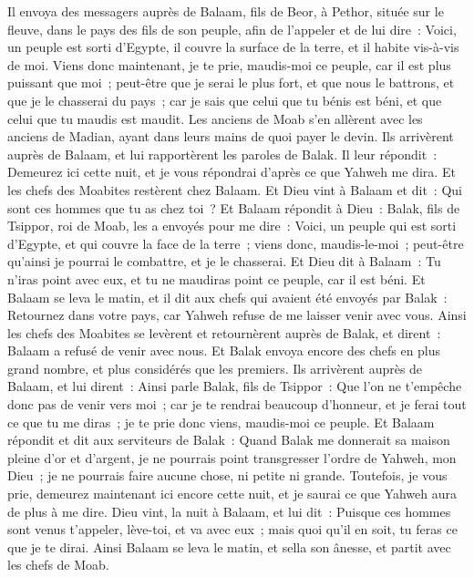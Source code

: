 \begin{multicols}{2}
Il envoya des messagers auprès de Balaam, fils de Beor, à Pethor, située sur le fleuve, dans le pays des fils de son peuple, afin de l'appeler et de lui dire~: Voici, un peuple est sorti d'Egypte, il couvre la surface de la terre, et il habite vis-à-vis de moi.
Viens donc maintenant, je te prie, maudis-moi ce peuple, car il est plus puissant que moi~; peut-être que je serai le plus fort, et que nous le battrons, et que je le chasserai du pays~; car je sais que celui que tu bénis est béni, et que celui que tu maudis est maudit.
Les anciens de Moab s'en allèrent avec les anciens de Madian, ayant dans leurs mains de quoi payer le devin. Ils arrivèrent auprès de Balaam, et lui rapportèrent les paroles de Balak.
Il leur répondit~: Demeurez ici cette nuit, et je vous répondrai d'après ce que Yahweh me dira. Et les chefs des Moabites restèrent chez Balaam.
Et Dieu vint à Balaam et dit~: Qui sont ces hommes que tu as chez toi~?
Et Balaam répondit à Dieu~: Balak, fils de Tsippor, roi de Moab, les a envoyés pour me dire~:
Voici, un peuple qui est sorti d'Egypte, et qui couvre la face de la terre~; viens donc, maudis-le-moi~; peut-être qu'ainsi je pourrai le combattre, et je le chasserai.
Et Dieu dit à Balaam~: Tu n'iras point avec eux, et tu ne maudiras point ce peuple, car il est béni.
Et Balaam se leva le matin, et il dit aux chefs qui avaient été envoyés par Balak~: Retournez dans votre pays, car Yahweh refuse de me laisser venir avec vous.
Ainsi les chefs des Moabites se levèrent et retournèrent auprès de Balak, et dirent~: Balaam a refusé de venir avec nous.
Et Balak envoya encore des chefs en plus grand nombre, et plus considérés que les premiers.
Ils arrivèrent auprès de Balaam, et lui dirent~: Ainsi parle Balak, fils de Tsippor~: Que l'on ne t'empêche donc pas de venir vers moi~;
car je te rendrai beaucoup d'honneur, et je ferai tout ce que tu me diras~; je te prie donc viens, maudis-moi ce peuple.
Et Balaam répondit et dit aux serviteurs de Balak~: Quand Balak me donnerait sa maison pleine d'or et d'argent, je ne pourrais point transgresser l'ordre de Yahweh, mon Dieu~; je ne pourrais faire aucune chose, ni petite ni grande.
Toutefois, je vous prie, demeurez maintenant ici encore cette nuit, et je saurai ce que Yahweh aura de plus à me dire.
Dieu vint, la nuit à Balaam, et lui dit~: Puisque ces hommes sont venus t'appeler, lève-toi, et va avec eux~; mais quoi qu'il en soit, tu feras ce que je te dirai.
Ainsi Balaam se leva le matin, et sella son ânesse, et partit avec les chefs de Moab.

\end{multicols}
